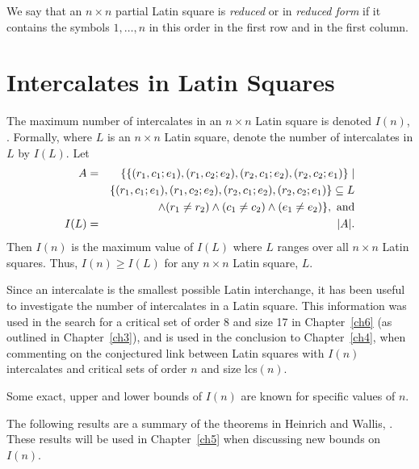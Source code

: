 \documentclass[12pt]{report}
\def\lcs#1{{\rm lcs}$(#1)$}
\begin{document}



We say that an $n \times n$ partial Latin square is {\it reduced} or in {\it
reduced form} if it contains the symbols $1, \dots, n$ in this order
in the first row and in the first column.

\section{Intercalates in Latin Squares}
The maximum number of intercalates in an $n \times n$ Latin square
is denoted $I(n)$, \cite{MR84g:05034}.  Formally, where $L$ is 
an $n \times n$ Latin square, denote the
number of intercalates in $L$ by $I(L)$.  Let
\begin{eqnarray*}
A & = & \{ \{ (r_1,c_1;e_1),(r_1,c_2;e_2),(r_2,c_1;e_2),(r_2,c_2;e_1) \} \mid \\
&& \{ (r_1,c_1;e_1),(r_1,c_2;e_2),(r_2,c_1;e_2),(r_2,c_2;e_1) \} \subseteq L \\
&& \wedge (r_1 \neq r_2) \wedge (c_1 \neq c_2) \wedge (e_1 \neq e_2) \}, {\rm~and} \\
I(L) & = & |A|.
\end{eqnarray*}
Then $I(n)$ is the maximum value of $I(L)$ where $L$ ranges over
all $n \times n$ Latin squares.  Thus, $I(n) \geq I(L)$ for
any $n \times n$ Latin square, $L$.

Since an intercalate is the smallest possible Latin interchange, it has
been useful to investigate the number of intercalates in a Latin square.
This information was used in the search for a critical set of order 8
and size 17 in Chapter~\ref{ch6} (as outlined in Chapter~\ref{ch3}), and is used
in the conclusion to Chapter~\ref{ch4}, when commenting on the conjectured link
between Latin squares with $I(n)$ intercalates and critical sets of
order $n$ and size \lcs{n}.


Some exact, upper and lower bounds of $I(n)$ are known for specific values 
of $n$.

The following results are a summary of the theorems in Heinrich and Wallis, 
\cite{MR84g:05034}.  These results will be used in Chapter~\ref{ch5} when
discussing new bounds on $I(n)$.
\end{document}
